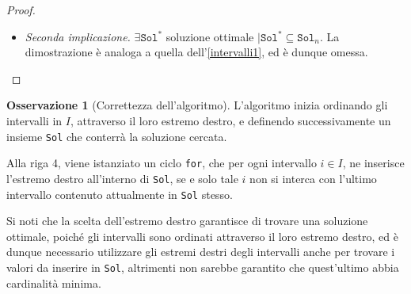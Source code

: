 \documentclass[14pt]{extreport}
\theoremstyle{definition}
\theoremstyle{definition}
\newtheorem{remark}{Osservazione}[subsection]
\begin{document}
\begin{proof}
\begin{itemize}
\begin{itemize}
                \item sia $j \in [1, n) \mid x \in [a_j, b_j]$; allora, si verifica uno dei seguenti casi:
                    \begin{itemize}
                        \item $j \le k \implies \exists \hat x \in \texttt{Sol}_k \mid \hat x \in [a_j, b_j]$ poiché doveva essere già stato analizzato dall'algoritmo
                        \item $j > k + 1 \implies b_j > b_{k +1}$; si noti inoltre che l'intervallo $[a_j, b_j]$ è stato scelto tale che $x \in [a_j, b_j]$, e poiché $x \in [a_{k +1}, b_{k +1}]$ per sua definizione, si verifica necessariamente che $$\left .\begin{array}{r} x \in [a_j , b_j] \cap [a_{k + 1}, b_{k +1}] \neq \varnothing \\ b_j > b_{k +1} \end{array} \right \} \implies a_j \le x \le b_{k +1} \le b_j$$ in particolare, si noti che $b_{k +1} \in [a_j, b_j]$, e poiché la dimostrazione non dipende dalla scelta di $x \in \texttt{Sol}^* - \texttt{Sol}_k$, né da $j \in [1, n)$, si ha che $b_{k +1}$ copre ogni intervallo coperto da $x$; allora, per far si che esista soluzione ottimale $\texttt{Sol}^*$ tale da contenere $\texttt{Sol}_{k +1} = \texttt{Sol}_k \cup \{b_{k +1}\}$, è sufficiente considerare $$(\texttt{Sol}^* - \{x\}) \cup \{b_{k +1}\}$$
                    \end{itemize}
            \end{itemize}
        \item[] \textit{Seconda implicazione.} $\exists \texttt{Sol}^*$ soluzione ottimale $\mid \texttt{Sol}^* \subseteq \texttt{Sol}_n$. La dimostrazione è analoga a quella dell'\cref{intervalli1}, ed è dunque omessa.
    \end{itemize}
\end{proof}

\begin{remark}[Correttezza dell'algoritmo]
    L'algoritmo inizia ordinando gli intervalli in $I$, attraverso il loro estremo destro, e definendo successivamente un insieme \texttt{Sol} che conterrà la soluzione cercata.

    Alla riga 4, viene istanziato un ciclo \texttt{for}, che per ogni intervallo $i \in I$, ne inserisce l'estremo destro all'interno di \texttt{Sol}, se e solo tale $i$ non si interca con l'ultimo intervallo contenuto attualmente in \texttt{Sol} stesso.

    Si noti che la scelta dell'estremo destro garantisce di trovare una soluzione ottimale, poiché gli intervalli sono ordinati attraverso il loro estremo destro, ed è dunque necessario utilizzare gli estremi destri degli intervalli anche per trovare i valori da inserire in \texttt{Sol}, altrimenti non sarebbe garantito che quest'ultimo abbia cardinalità minima.
\end{remark}
\end{document}
